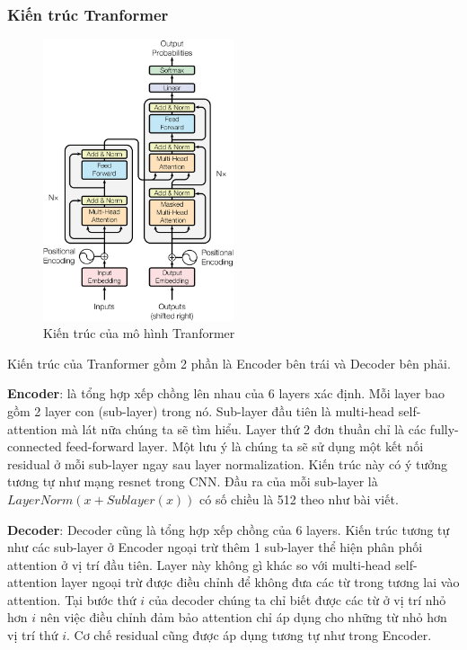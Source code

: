 \subsubsection{Kiến trúc Tranformer}
\begin{figure}[htb]
    \centering
    \includegraphics[width=0.5\textwidth]{image/tranformer-architecture.png}
    \caption{Kiến trúc của mô hình Tranformer \cite{46201}}
    \label{figure:tranformer-architecture}
\end{figure}

Kiến trúc của Tranformer gồm 2 phần là Encoder bên trái và Decoder bên phải\cite{webpage23}.

\textbf{Encoder}: là tổng hợp xếp chồng lên nhau của 6 layers xác định. Mỗi layer bao gồm 2 layer con (sub-layer) trong nó. Sub-layer đầu tiên là multi-head self-attention mà lát nữa chúng ta sẽ tìm hiểu. Layer thứ 2 đơn thuần chỉ là các fully-connected feed-forward layer. Một lưu ý là chúng ta sẽ sử dụng một kết nối residual ở mỗi sub-layer ngay sau layer normalization. Kiến trúc này có ý tưởng tương tự như mạng resnet trong CNN. Đầu ra của mỗi sub-layer là $LayerNorm(x+Sublayer(x))$ có số chiều là 512 theo như bài viết.

\textbf{Decoder}: Decoder cũng là tổng hợp xếp chồng của 6 layers. Kiến trúc tương tự như các sub-layer ở Encoder ngoại trừ thêm 1 sub-layer thể hiện phân phối attention ở vị trí đầu tiên. Layer này không gì khác so với multi-head self-attention layer ngoại trừ được điều chỉnh để không đưa các từ trong tương lai vào attention. Tại bước thứ $i$ của decoder chúng ta chỉ biết được các từ ở vị trí nhỏ hơn $i$ nên việc điều chỉnh đảm bảo attention chỉ áp dụng cho những từ nhỏ hơn vị trí thứ $i$. Cơ chế residual cũng được áp dụng tương tự như trong Encoder.

